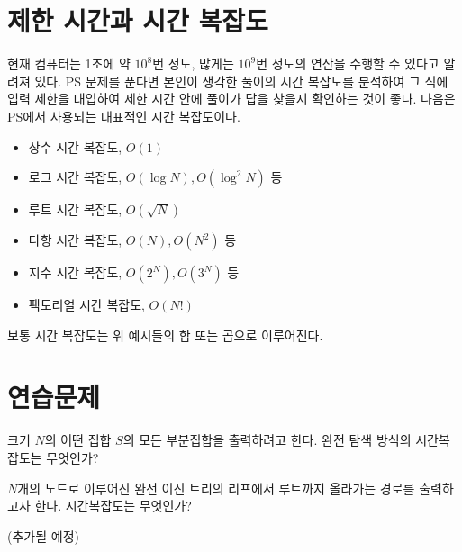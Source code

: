 \section{제한 시간과 시간 복잡도}
현재 컴퓨터는 1초에 약 $10^8$번 정도, 많게는 $10^9$번 정도의 연산을 수행할 수 있다고 알려져 있다. PS 문제를 푼다면 본인이 생각한 풀이의 시간 복잡도를 분석하여 그 식에 입력 제한을 대입하여 제한 시간 안에 풀이가 답을 찾을지 확인하는 것이 좋다. 다음은 PS에서 사용되는 대표적인 시간 복잡도이다.
\begin{itemize}
    \item 상수 시간 복잡도, $O(1)$
    \item 로그 시간 복잡도, $O(\log N), O(\log^2 N)$ 등
    \item 루트 시간 복잡도, $O(\sqrt N)$
    \item 다항 시간 복잡도, $O(N), O(N^2)$ 등
    \item 지수 시간 복잡도, $O(2^N), O(3^N)$ 등
    \item 팩토리얼 시간 복잡도, $O(N!)$
\end{itemize}
보통 시간 복잡도는 위 예시들의 합 또는 곱으로 이루어진다.

\section{연습문제}
\begin{problem}
    크기 $N$의 어떤 집합 $S$의 모든 부분집합을 출력하려고 한다. 완전 탐색 방식의 시간복잡도는 무엇인가?
\end{problem}
\begin{problem}
    $N$개의 노드로 이루어진 완전 이진 트리의 리프에서 루트까지 올라가는 경로를 출력하고자 한다. 시간복잡도는 무엇인가?
\end{problem}

(추가될 예정)